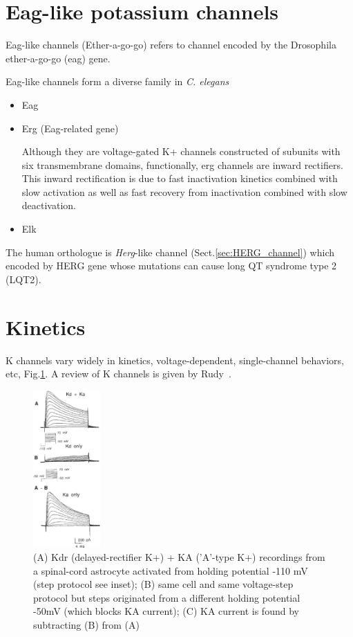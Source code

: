 \section{Eag-like potassium channels}
\label{sec:Eag-like_Kchannel}
\label{sec:erg-related-gene}

Eag-like channels (Ether-a-go-go) refers to channel encoded by the Drosophila
ether-a-go-go (eag) gene. 

 Eag-like channels form a diverse family in {\it C. elegans}
\begin{itemize}
  \item Eag
  \item Erg (Eag-related gene)
  
Although they are voltage-gated K+ channels constructed of subunits with six
transmembrane domains, functionally, erg channels are inward rectifiers. This
inward rectification is due to fast inactivation kinetics combined with slow
activation as well as fast recovery from inactivation combined with slow
deactivation.

  
  \item Elk
\end{itemize}

The human orthologue is {\it Herg}-like channel (Sect.\ref{sec:HERG_channel})
which encoded by HERG gene whose mutations can cause long QT syndrome type 2
(LQT2).



\section{Kinetics}

K channels vary widely in kinetics, voltage-dependent, single-channel behaviors,
etc, Fig.\ref{fig:KA-current-Kdr-current}. A review of K channels is given by
Rudy~\citep{rudy1988duk}.

\begin{figure}[hbt]
  \centerline{\includegraphics[height=6cm,
    angle=0]{./images/KA-current-Kdr-current.eps}}
  \caption{(A) Kdr (delayed-rectifier K+) + KA ('A'-type K+) recordings from
a spinal-cord astrocyte activated from holding potential -110 mV (step protocol
see inset); (B) same cell and same voltage-step
protocol but steps originated from a different holding potential -50mV (which
blocks KA current); (C) KA current is found by subtracting (B) from (A)}
\label{fig:KA-current-Kdr-current}
\end{figure}


